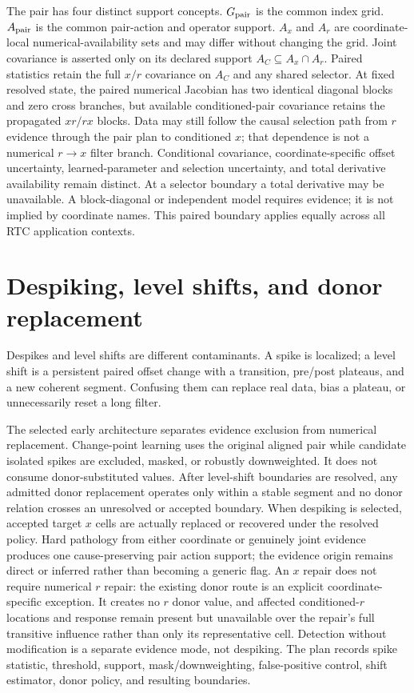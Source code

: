 \documentclass[10pt]{article}
\begin{document}
The pair has four distinct support concepts.  $G_{\rm pair}$ is the common
index grid.  $A_{\rm pair}$ is the common pair-action and operator support.
$A_x$ and $A_r$ are coordinate-local numerical-availability sets and may
differ without changing the grid.  Joint covariance is asserted only on its
declared support $A_C\subseteq A_x\cap A_r$.  Paired statistics retain the
full $x/r$ covariance on $A_C$ and any shared selector.  At fixed resolved
state, the paired numerical Jacobian has
two identical diagonal blocks and zero cross branches, but available
conditioned-pair covariance retains the propagated $xr/rx$ blocks.  Data may
still follow the causal selection path from $r$ evidence through the pair
plan to conditioned $x$; that dependence is not a numerical $r\rightarrow x$
filter branch.  Conditional covariance, coordinate-specific offset
uncertainty, learned-parameter and selection uncertainty, and total derivative
availability remain distinct.  At a selector boundary a total derivative may
be unavailable.  A
block-diagonal or independent model requires evidence; it is not implied by
coordinate names.  This paired boundary applies equally across all RTC
application contexts.

\section{Despiking, level shifts, and donor replacement}
\label{sec:rat-early-conditioning}
Despikes and level shifts are different contaminants. A spike is localized;
a level shift is a persistent paired offset change with a transition,
pre/post plateaus, and a new coherent segment. Confusing them can replace real
data, bias a plateau, or unnecessarily reset a long filter.

The selected early architecture separates evidence exclusion from numerical
replacement.  Change-point learning uses the original aligned pair while
candidate isolated spikes are excluded, masked, or robustly downweighted.  It
does not consume donor-substituted values.  After level-shift boundaries are
resolved, any admitted donor replacement operates only within a stable segment
and no donor relation crosses an unresolved or accepted boundary.  When
despiking is selected, accepted target $x$ cells are actually replaced or
recovered under the resolved policy.  Hard pathology from either coordinate
or genuinely joint evidence produces one cause-preserving pair action support;
the evidence origin remains direct or inferred rather than becoming a generic
flag.  An $x$ repair does not require numerical $r$ repair: the existing donor
route is an explicit coordinate-specific exception.  It creates no $r$ donor
value, and affected conditioned-$r$ locations and response remain present but
unavailable over the repair's full transitive influence rather than only its
representative cell.
Detection without modification is a
separate evidence mode, not despiking. The plan records spike statistic,
threshold, support, mask/downweighting, false-positive control, shift
estimator, donor policy, and resulting boundaries.
\end{document}
